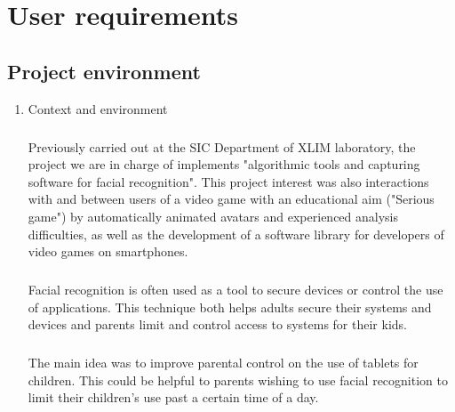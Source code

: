 \chapter{User requirements}%


\section{Project environment}

\begin{enumerate}
	\item Context and environment \paragraph{}
Previously carried out at the SIC Department of XLIM laboratory, the project we are in charge of implements "algorithmic tools and capturing software for facial recognition". This project interest was also interactions with and between users of a video game with an educational aim ("Serious game") by automatically animated avatars and experienced analysis difficulties, as well as the development of a software library for developers of video games on smartphones.\paragraph{}
Facial recognition is often used as a tool to secure devices or control the use of applications. This technique both helps adults secure their systems and devices and parents limit and control access to systems for their kids.\paragraph{}
The main idea was to improve parental control on the use of tablets for children. This could be helpful to parents wishing to use facial recognition to limit their children's use past a certain time of a day.
\vspace{0.5cm}
\end{enumerate}

